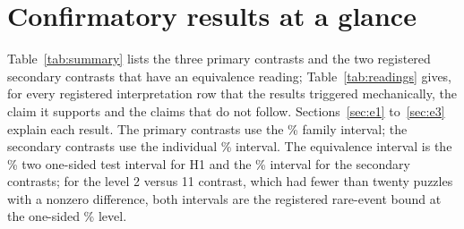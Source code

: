 \section{Confirmatory results at a glance}
\label{sec:summary}

Table~\ref{tab:summary} lists the three primary contrasts and the two registered secondary contrasts that have an equivalence reading; Table~\ref{tab:readings} gives, for every registered interpretation row that the results triggered mechanically, the claim it supports and the claims that do not follow. Sections~\ref{sec:e1} to~\ref{sec:e3} explain each result. The primary contrasts use the \% family interval; the secondary contrasts use the individual \% interval. The equivalence interval is the \% two one-sided test interval for H1 and the \% interval for the secondary contrasts; for the level 2 versus 11 contrast, which had fewer than twenty puzzles with a nonzero difference, both intervals are the registered rare-event bound at the one-sided \% level.

\begin{table}[htbp]
\centering
\caption{Confirmatory and registered secondary contrasts. Brier: difference in Brier loss (H1: permuted control minus generated state, positive when the generated state reads better; level 12: teacher minus generated). pp: difference in solve share, in percentage points (H2 and level 2 vs.\ 11: change at the earlier level minus change at level 11, negative when the earlier level costs more; H3: positive when regenerating the later levels helps). Threshold: practical threshold (H2, H3) or equivalence range.}
\label{tab:summary}
\footnotesize
{}
\end{table}

\begin{table}[htbp]
\centering
\caption{Registered interpretation of every mechanically triggered row: the result that triggered it, the claim it supports and the claims that do not follow from it (verbatim from the registered interpretation table). The H3 row presumes a checkpoint trained with level corruption; the NCM paper describes such training for the method, and we assume, without training metadata to verify it, that the released checkpoint followed it.}
\label{tab:readings}
\footnotesize
{}
\end{table}

